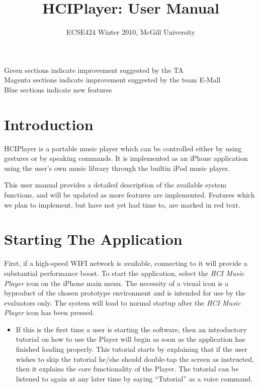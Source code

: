 \documentclass[12pt,letterpaper]{article}
\begin{document}
\title{HCIPlayer: User Manual}
\author{ECSE424 Winter 2010, McGill University}
\renewcommand{\today}{Updated: Wednesday, March 24th, 2010}
\maketitle

\begin{center}
{\color{green} Green} sections indicate improvement suggested by the TA \\
{\color{magenta} Magenta} sections indicate improvement suggested by the team E-Mall \\
{\color{blue} Blue} sections indicate new features
\end{center}

\section{Introduction}

HCIPlayer is a portable music player which can be controlled either by using gestures or by speaking commands. It is implemented as an iPhone application using the user's own music library through the builtin iPod music player.

This user manual provides a detailed description of the available system functions, and will be updated as more features are implemented. Features which we plan to implement, but have not yet had time to, are {\color{red} marked in red text}.

\section{Starting The Application}
First, if a high-speed WIFI network is available, connecting to it will provide a substantial performance boost. To start the application, select the \emph{HCI Music Player} icon on the iPhone main menu. The necessity of a visual icon is a byproduct of the chosen prototype environment and is intended for use by the evaluators only. The system will load to normal startup after the \emph{HCI Music Player} icon has been pressed.
\begin{itemize}
\item If this is the first time a user is starting the software, then an introductory tutorial on how to use the Player will begin as soon as the application has finished loading properly. This tutorial starts by explaining that if the user wishes to skip the tutorial he/she should double-tap the screen as instructed, then it explains the core functionality of the Player. {\color{blue} The tutorial can be listened to again at any later time by saying ``Tutorial'' as a voice command.}
\end{itemize}
\end{document}
